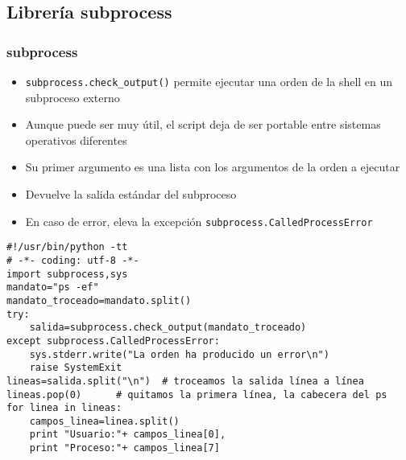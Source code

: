 \documentclass[ucs]{beamer}
\begin{document}
\subsection{Librería subprocess}
\begin{frame}[fragile]
\frametitle{subprocess}
\begin{itemize}
\item
\verb|subprocess.check_output()| permite ejecutar una orden de la shell en un subproceso externo
\item
Aunque puede ser muy útil, el script deja de ser portable entre
sistemas operativos diferentes
\item
Su primer argumento es una lista con los argumentos de la orden a ejecutar
\item
Devuelve la salida estándar del subproceso
\item
En caso de error, eleva la excepción \verb|subprocess.CalledProcessError|
\end{itemize}
\end{frame}

\begin{frame}[fragile]

  \begin{footnotesize}
  \begin{verbatim}
#!/usr/bin/python -tt
# -*- coding: utf-8 -*-
import subprocess,sys
mandato="ps -ef"
mandato_troceado=mandato.split()
try:
    salida=subprocess.check_output(mandato_troceado)
except subprocess.CalledProcessError:
    sys.stderr.write("La orden ha producido un error\n")
    raise SystemExit
lineas=salida.split("\n")  # troceamos la salida línea a línea
lineas.pop(0)      # quitamos la primera línea, la cabecera del ps
for linea in lineas:
    campos_linea=linea.split()
    print "Usuario:"+ campos_linea[0],
    print "Proceso:"+ campos_linea[7]
  \end{verbatim}
  \end{footnotesize}
\end{frame}
\end{document}
